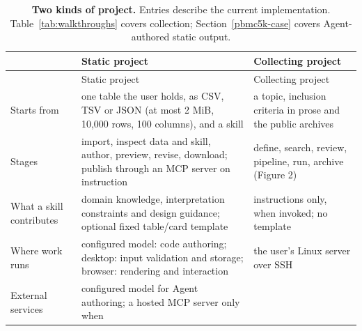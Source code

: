 \documentclass[11pt,a4paper]{article}
\begin{document}
\begin{longtable}[]{@{}
  >{\raggedright\arraybackslash}p{}
  >{\raggedright\arraybackslash}p{}
  >{\raggedright\arraybackslash}p{}@{}}
\caption{\label{tab:modes}\textbf{Two kinds of project.} Entries
describe the current implementation. Table~\ref{tab:walkthroughs} covers
collection; Section~\ref{pbmc5k-case} covers Agent-authored static output.}\tabularnewline
\toprule\noalign{}
\begin{minipage}[b]{\linewidth}\raggedright
\end{minipage} & \begin{minipage}[b]{\linewidth}\raggedright
Static project
\end{minipage} & \begin{minipage}[b]{\linewidth}\raggedright
Collecting project
\end{minipage} \\
\midrule\noalign{}
\endfirsthead
\toprule\noalign{}
\begin{minipage}[b]{\linewidth}\raggedright
\end{minipage} & \begin{minipage}[b]{\linewidth}\raggedright
Static project
\end{minipage} & \begin{minipage}[b]{\linewidth}\raggedright
Collecting project
\end{minipage} \\
\midrule\noalign{}
\endhead
\bottomrule\noalign{}
\endlastfoot
Starts from & one table the user holds, as CSV, TSV or JSON (at most 2
MiB, 10,000 rows, 100 columns), and a skill & a topic, inclusion criteria
in prose and the public archives \\
Stages & import, inspect data and skill, author, preview, revise, download; publish
through an MCP server on instruction & define, search, review, pipeline,
run, archive (Figure 2) \\
What a skill contributes & domain knowledge, interpretation constraints
and design guidance; optional fixed table/card template & instructions only, when invoked; no template \\
Where work runs & configured model: code authoring; desktop: input
validation and storage; browser: rendering and interaction & the user's Linux server over SSH \\
External services & configured model for Agent authoring; a hosted MCP
server only when

\end{longtable}
\end{document}
